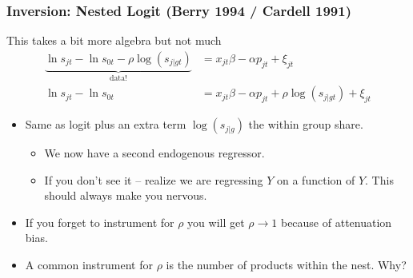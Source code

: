 \documentclass[aspectratio=169,10pt]{beamer}
\begin{document}
\begin{frame}
\frametitle{Inversion: Nested Logit (Berry 1994 / Cardell 1991)}
This takes a bit more algebra but not much
\begin{align*}
\underbrace{\ln s_{jt}- \ln s_{0t}  - \rho \log(s_{j|gt}) }_{\text{data!}}&= x_{jt} \beta -\alpha p_{jt} +  \xi_{jt} \\
\ln s_{jt}- \ln s_{0t} &= x_{jt} \beta -\alpha p_{jt} +  \rho \log(s_{j|gt})  +  \xi_{jt}
\end{align*}
 \begin{itemize}
\item Same as logit plus an extra term $\log(s_{j|g})$ the \alert{within group share}.
\begin{itemize}
\item We now have a second endogenous regressor.
\item If you don't see it -- realize we are regressing $Y$ on a function of $Y$. This should always make you nervous.
 \end{itemize}
\item If you forget to instrument for $\rho$ you will get $\rho \rightarrow 1$ because of \alert{attenuation bias}.
\item A common instrument for $\rho$ is the number of products within the nest. Why?
 \end{itemize}
\end{frame}
\end{document}
